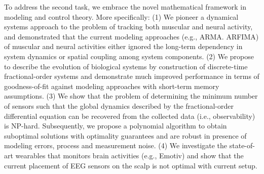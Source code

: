  To address the second task, we embrace the novel mathematical framework in modeling and control theory. More specifically: (1) We pioneer a dynamical systems approach to the problem of tracking both muscular and neural activity, and demonstrated that the current modeling approaches (e.g., ARMA. ARFIMA) of muscular and neural activities either ignored the long-term dependency in system dynamics or spatial coupling among system components. (2) We propose to describe the evolution of biological systems by construction of discrete-time fractional-order systems and demonstrate much improved performance in terms of goodness-of-fit against modeling approaches with short-term memory assumptions. (3) We show that the problem of determining the minimum number of sensors such that the global dynamics described by the fractional-order differential equation can be recovered from the collected data (i.e., observability) is NP-hard. Subsequently, we propose a polynomial algorithm to obtain suboptimal solutions with optimality guarantees and are robust in presence of modeling errors, process and measurement noise. (4) We investigate the state-of-art wearables that monitors brain activities (e.g., Emotiv) and show that the current placement of EEG sensors on the scalp is not optimal with current setup.

\Blindtext[1]
